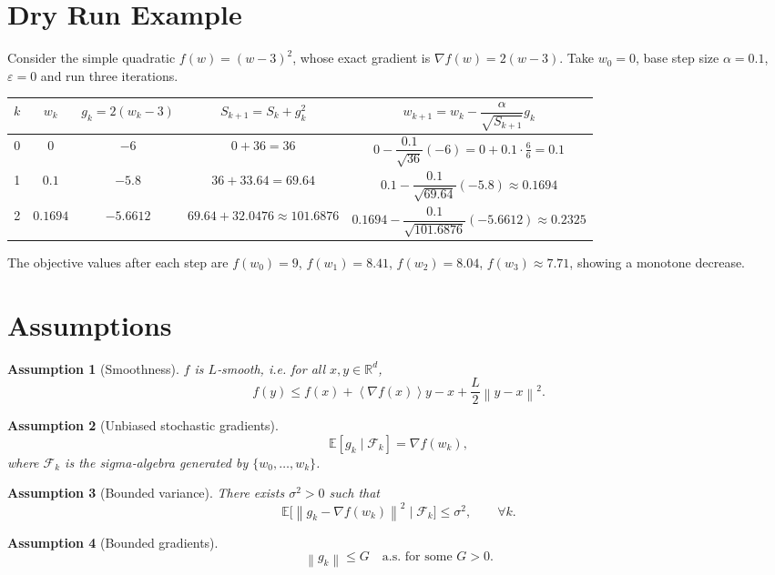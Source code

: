 \documentclass{article}
\newtheorem{assumption}{Assumption}
\newcommand{\E}{\mathbb{E}}
\newcommand{\norm}[1]{\left\lVert#1\right\rVert}
\newcommand{\inner}[1]{\left\langle#1\right\rangle}
\begin{document}
\section*{Dry Run Example}
Consider the simple quadratic $f(w)=(w-3)^2$, whose exact gradient is $\nabla f(w)=2(w-3)$.  
Take $w_0=0$, base step size $\alpha=0.1$, $\varepsilon=0$ and run three iterations.

\begin{center}
\begin{tabular}{c|c|c|c|c}
$k$ & $w_k$ & $g_k=2(w_k-3)$ & $S_{k+1}=S_k+g_k^{2}$ & $w_{k+1}=w_k-\dfrac{\alpha}{\sqrt{S_{k+1}}}g_k$\\\hline
0 & $0$ & $-6$ & $0+36=36$ & $0-\dfrac{0.1}{\sqrt{36}}(-6)=0+0.1\cdot\frac{6}{6}=0.1$\\
1 & $0.1$ & $-5.8$ & $36+33.64=69.64$ & $0.1-\dfrac{0.1}{\sqrt{69.64}}(-5.8)
\approx0.1694$\\
2 & $0.1694$ & $-5.6612$ & $69.64+32.0476\approx101.6876$ &
$0.1694-\dfrac{0.1}{\sqrt{101.6876}}(-5.6612)
\approx0.2325$
\end{tabular}
\end{center}
The objective values after each step are $f(w_0)=9$, $f(w_1)=8.41$, $f(w_2)=8.04$, $f(w_3)\approx7.71$, showing a monotone decrease.

\section*{Assumptions}
\begin{assumption}[Smoothness]\label{ass:smooth}
$f$ is $L$‑smooth, i.e. for all $x,y\in\mathbb{R}^{d}$,
\[
f(y)\le f(x)+\inner{\nabla f(x)}{y-x}+\frac{L}{2}\norm{y-x}^{2}.
\tag{A1}
\]
\end{assumption}
\begin{assumption}[Unbiased stochastic gradients]\label{ass:unbiased}
\[
\E[g_k\mid\mathcal{F}_{k}]=\nabla f(w_k),
\tag{A2}
\]
where $\mathcal{F}_{k}$ is the sigma‑algebra generated by $\{w_0,\dots,w_k\}$.
\end{assumption}
\begin{assumption}[Bounded variance]\label{ass:variance}
There exists $\sigma^{2}>0$ such that
\[
\E\!\big[\norm{g_k-\nabla f(w_k)}^{2}\mid\mathcal{F}_{k}\big]\le\sigma^{2},
\qquad\forall k.
\tag{A3}
\]
\end{assumption}
\begin{assumption}[Bounded gradients]\label{ass:bounded}
\[
\norm{g_k}\le G\quad\text{a.s. for some }G>0.
\tag{A4}
\]
\end{assumption}
\end{document}

